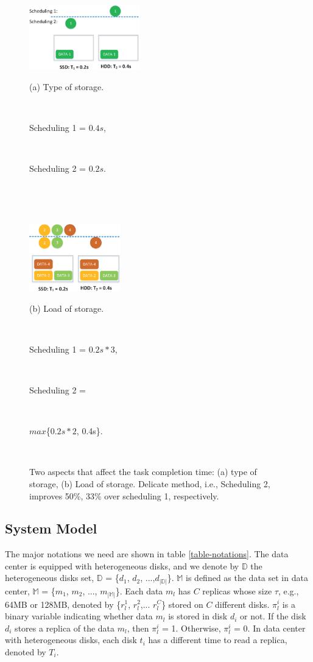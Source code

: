 \documentclass[conference]{IEEEtran}
\begin{document}
\begin{figure}[!t]
\centering
    \begin{minipage}{4.78cm}
        \includegraphics[width=4.78cm]{fig_example1_3.eps}
        \centerline{(a) Type of storage.}\\
        \centerline{Scheduling 1 = $0.4s$,}\\
        \centerline{Scheduling 2 = $0.2s$.}\\
         \centerline{}\\
    \end{minipage}
    \begin{minipage}{3.95cm}
        \includegraphics[width=3.95cm]{fig_example2_2.eps}
        \centerline{(b) Load of storage.}\\
        \centerline{Scheduling 1 = $0.2s*3$,}\\
        \centerline{Scheduling 2 = \;\;\;\;\;\;\;\;\;\;\;\;\;}\\
        \centerline{$max$\{$0.2s*2$, 0.4s\}.}\\
    \end{minipage}
    \vspace{-0.4cm}
    \caption{Two aspects that affect the task completion time: (a) type of storage, (b) Load of storage. Delicate method, i.e., Scheduling 2, improves 50\%, 33\% over scheduling 1, respectively.}
    \label{Fig:example}
    \vspace{-0.2cm}
\end{figure}


\subsection{System Model}

The major notations we need are shown in table \ref{table-notations}. The data center is equipped with heterogeneous disks, and we denote by $\mathbb{D}$ the heterogeneous disks set, $\mathbb{D}$ = \{$d_{1}$, $d_{2}$, ...,$d_{|\mathbb{D}|}$\}. $\mathbb{M}$ is defined as the data set in data center, $\mathbb{M}$ = \{$m_{1}$, $m_{2}$, ..., $m_{|\mathbb{M}|}$\}. Each data $m_{l}$ has $C$ replicas whose size $\tau$, e.g., 64MB or 128MB, denoted by \{$r_l^1$, $r_l^2$,... $r_l^{C}$\} stored on $C$ different disks. $\pi_l^{i}$ is a binary variable indicating whether data $m_l$ is stored in disk $d_i$ or not.
If the disk $d_{i}$ stores a replica of the data $m_l$, then $\pi_l^{i}$ = 1. Otherwise, $\pi_l^{i}$ = 0. In data center with heterogeneous disks, each disk $t_i$ has a different time to read a replica, denoted by $T_i$.
\end{document}
